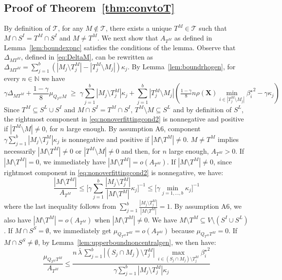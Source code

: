\documentclass[aos]{imsart}
\theoremstyle{plain}
\newcommand{\N}{\mathbb{N}}
\newcommand{\bs}{\boldsymbol}
\begin{document}
\begin{supplement}
\subsection{Proof of Theorem~\ref{thm:convtoT}}
By definition of $\mathcal{T}$, for any $M \not\in\mathcal{T}$, there exists a unique $T^M\in\mathcal{T}$ such that $M\cap S^I=T^M\cap S^I$ and $M\neq T^M$. We next show that $A_{T^M}$ as defined in Lemma~\ref{lem:boundexpnc} satisfies the conditions of the lemma. Observe that $\Delta_{MT^M}$, defined in \eqref{eq:DeltaM}, can be rewritten as $\Delta_{MT^M}=\sum_{j=1}^b(|M_j\setminus T^M_j|-|T^M_j\setminus M_j|)\kappa_j$. By  Lemma~\ref{lem:boundrhogen}, for every $n\in \N$ we have 
\begin{equation}\label{eq:nonoverfittingcond2}
   \gamma \Delta_{MT^M}+\frac{1-\gamma}{8}\mu_{Q_{T^M}M}\;\geq\; \gamma\sum_{j=1}^b|M_j \setminus T^M_j|\kappa_j + \sum_{j=1}^b |T^M_j\setminus M_j |\left(\tfrac{1-\gamma}{8} n \rho(\bs X) \min_{i\in |T^M_j\setminus M_j|}{\beta^{\star}_i}^{2} - \gamma\kappa_j\right) 
\end{equation} 
Since $T^M \subseteq S^L \cup S^I$ and $M\cap S^I=T^M\cap S^I$, $T^M\setminus M \subseteq S^L$ and by definition of $S^L$, the rightmost component in \eqref{eq:nonoverfittingcond2} is nonnegative and positive if $|T^M\setminus M|\neq0$, for $n$ large enough. By assumption A6, component $\gamma\sum_{j=1}^b|M_j \setminus T^M_j|\kappa_j$ is nonnegative and positive if $|M\setminus T^M|\neq0$.  $M\neq T^M$ implies necessarily $|M\setminus T^M|\neq0$ or $|T^M\setminus M|\neq0$ and then, for $n$ large enough, $A_{T^M}>0$. If $|M\setminus T^M|=0$, we immediately have $|M\setminus T^M|=o(A_{T^M})$. If $|M\setminus T^M|\neq 0$, since rightmost component in \eqref{eq:nonoverfittingcond2} is nonnegative, we have:
$$\frac{|M\setminus T^M|}{A_{T^M}}\leq \bigg[ \gamma\sum_{j=1}^b\frac{|M_j \setminus T^M_j|}{|M\setminus T^M|}\kappa_j \bigg]^{-1} \leq \bigg[ \gamma\min_{j=1,\ldots,b}\kappa_j \bigg]^{-1} $$
where the last inequality follows from $\sum_{j=1}^b\frac{|M_j \setminus T^M_j|}{|M\setminus T^M|}=1$. By assumption A6, we also have $|M\setminus T^M|=o(A_{T^M})$ when $|M\setminus T^M|\neq 0$. 
We have $M\setminus T^M\subseteq V\setminus (S^I \cup S^L)$. If $M\cap S^S=\emptyset$, we immediately get $\mu_{Q_{T^M} T^M}=o(A_{T^M})$ because $\mu_{Q_{T^M} T^M}=0$. If $M\cap S^S\neq\emptyset$, by Lemma~\ref{lem:upperboundnoncentralgen}, we then have:
$$\frac{\mu_{Q_{T^M} T^M}}{ A_{T^M}} \leq \frac{n\,\bar{\lambda}\,\sum_{j=1}^b|(S_j\cap M_j )\setminus T^M_j|\,\max_{i\in (S_j\cap M_j )\setminus T^M_j}{\beta_{i}^{\star}}^2}{ \gamma\sum_{j=1}^b|M_j \setminus T^M_j|\kappa_j}$$

\end{supplement}
\end{document}
